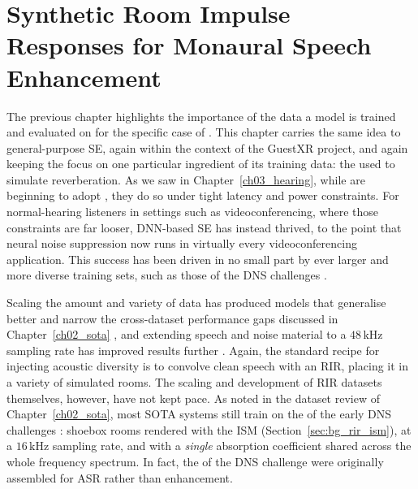 
\chapter{Synthetic Room Impulse Responses for Monaural Speech Enhancement}
\label{ch04_mbrirs}

The previous chapter highlights the importance of the data a model is trained and evaluated on for the specific case of . This chapter carries the same idea to general-purpose \acrshort{SE}, again within the context of the GuestXR project, and again keeping the focus on one particular ingredient of its training data: the  used to simulate reverberation. As we saw in Chapter~\ref{ch03_hearing}, while  are beginning to adopt , they do so under tight latency and power constraints. For normal-hearing listeners in settings such as videoconferencing, where those constraints are far looser, \acrshort{DNN}-based \acrshort{SE} has instead thrived, to the point that neural noise suppression now runs in virtually every videoconferencing application. This success has been driven in no small part by ever larger and more diverse training sets, such as those of the \acrfull{DNS} challenges \citep{dns5}.

Scaling the amount and variety of data has produced models that generalise better and narrow the cross-dataset performance gaps discussed in
Chapter~\ref{ch02_sota} \citep{richter2023speech, kadiouglu2020empirical}, and
extending speech and noise material to a $48\,\text{kHz}$ sampling rate has
improved results further \citep{schroter2023deepfilternet3, zhang2023toward,
zhang2024urgent}. Again, the standard recipe for injecting acoustic diversity is to convolve clean speech with an \acrshort{RIR}, placing it in a variety of
simulated rooms. The scaling and development of \acrshort{RIR} datasets themselves, however, have not kept pace. As noted in the
dataset review of Chapter~\ref{ch02_sota}, most \acrshort{SOTA} systems still train on the  of the early \acrshort{DNS} challenges \citep{ko2017study}: shoebox rooms rendered with the \acrfull{ISM}
(Section~\ref{sec:bg_rir_ism}), at a $16\,\text{kHz}$ sampling rate, and with a
\emph{single} absorption coefficient shared across the whole frequency
spectrum. In fact, the  of the \acrshort{DNS} challenge were originally assembled for \acrshort{ASR} rather
than enhancement. 

